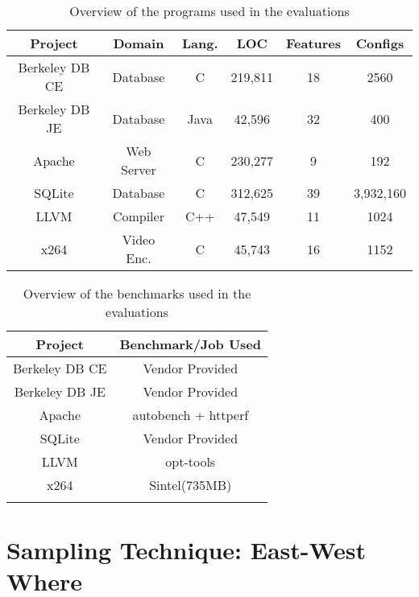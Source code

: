 \documentclass{sig-alternative}
\begin{document}
\begin{table*}[!h]
 
 \begin{tabular}{c c c c c c} 

 
 \hline
 Project & Domain & Lang. & LOC & Features & Configs \\  
 \hline
 Berkeley DB CE & Database & C & 219,811 & 18 & 2560  \\ 
 
 Berkeley DB JE & Database & Java & 42,596 & 32 & 400 \\

 Apache & Web Server & C & 230,277 & 9 & 192 \\

 SQLite & Database & C & 312,625 & 39 & 3,932,160 \\
 
 LLVM & Compiler & C++ & 47,549 & 11 & 1024 \\ 

 x264 & Video Enc. & C & 45,743 & 16 & 1152 \\ 

\end{tabular}
 \caption{Overview of the programs used in the evaluations}
\end{table*}


 \begin{table*}[!h]
 

 \begin{tabular}{c c } 
 \hline
 Project & Benchmark/Job Used  \\  
 \hline
 Berkeley DB CE & Vendor Provided  \\ 
 
 Berkeley DB JE & Vendor Provided \\

 Apache & autobench + httperf \\

 SQLite & Vendor Provided \\
 
 LLVM & opt-tools \\ 

 x264 & Sintel(735MB) \\
 

\label{BenchMarkUsed} 
\end{tabular}
\caption{Overview of the benchmarks used in the evaluations}
\end{table*}
\section{Sampling Technique: East-West Where}
\end{document}
